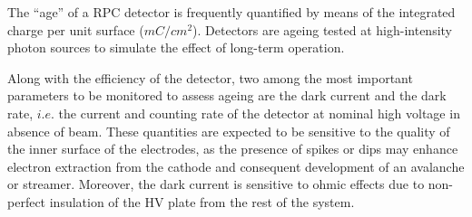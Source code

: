 The “age” of a RPC detector is frequently quantified by means of the integrated charge per unit surface ($mC/cm^2$). 
Detectors are ageing tested at high-intensity photon sources to simulate the effect of long-term operation.



Along with the efficiency of the detector, two among the most important parameters to be monitored to assess ageing are the dark current and the dark rate, $i.e.$ the current and counting rate of the detector at nominal high voltage in absence of beam.
These quantities are expected to be sensitive to the quality of the inner surface of the electrodes, as the presence of spikes or dips may enhance electron extraction from the cathode and consequent development of an avalanche or streamer.
Moreover, the dark current is sensitive to ohmic effects due to non-perfect insulation of the HV plate from the rest of the system.


